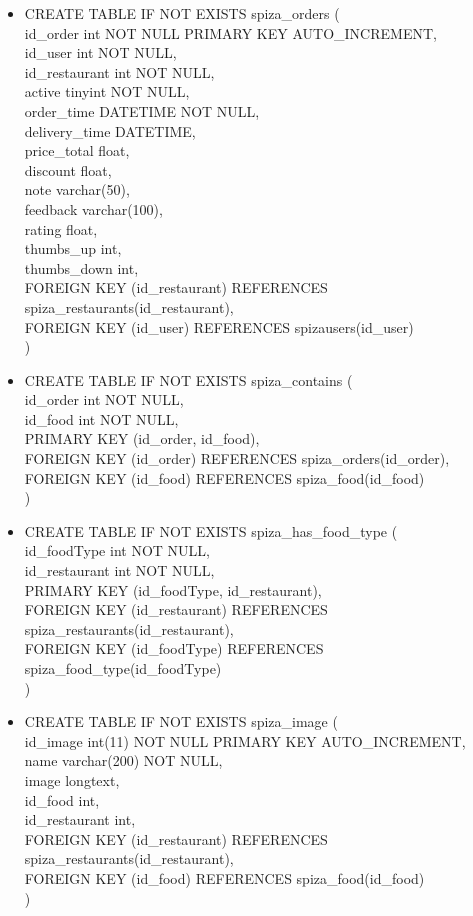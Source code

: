 \documentclass[12pt]{scrartcl}
\begin{document}
\begin{itemize}
    )
    \item[] CREATE TABLE IF NOT EXISTS spiza\_orders  (\\
    id\_order int NOT NULL PRIMARY KEY AUTO\_INCREMENT,\\
    id\_user int NOT NULL,\\
    id\_restaurant int NOT NULL,\\
    active tinyint NOT NULL,\\
    order\_time DATETIME NOT NULL,\\
    delivery\_time DATETIME,\\
    price\_total float,\\ 
    discount float,\\
    note varchar(50),\\
    feedback varchar(100),\\
    rating float,\\
    thumbs\_up int,\\
    thumbs\_down int, \\
    FOREIGN KEY (id\_restaurant) REFERENCES spiza\_restaurants(id\_restaurant),\\
    FOREIGN KEY (id\_user) REFERENCES spiza\textunderscore users(id\_user)\\
    )
    \item[] CREATE TABLE IF NOT EXISTS spiza\_contains (\\
    id\_order int NOT NULL,\\
    id\_food int NOT NULL,\\
    PRIMARY KEY (id\_order, id\_food),\\
    FOREIGN KEY (id\_order) REFERENCES spiza\_orders(id\_order),\\
    FOREIGN KEY (id\_food) REFERENCES spiza\_food(id\_food)\\
    )
    \item[] CREATE TABLE IF NOT EXISTS spiza\_has\_food\_type (\\
    id\_foodType int NOT NULL,\\
    id\_restaurant int NOT NULL,\\
    PRIMARY KEY (id\_foodType, id\_restaurant),\\
    FOREIGN KEY (id\_restaurant) REFERENCES spiza\_restaurants(id\_restaurant),\\
    FOREIGN KEY (id\_foodType) REFERENCES spiza\_food\_type(id\_foodType)\\
    )
    \item[] CREATE TABLE IF NOT EXISTS spiza\_image (\\
    id\_image int(11) NOT NULL PRIMARY KEY AUTO\_INCREMENT,\\
    name varchar(200) NOT NULL,\\
    image longtext,\\
    id\_food int,\\
    id\_restaurant int,\\
    FOREIGN KEY (id\_restaurant) REFERENCES spiza\_restaurants(id\_restaurant),\\
    FOREIGN KEY (id\_food) REFERENCES spiza\_food(id\_food)\\
    )
\end{itemize}
\end{document}
